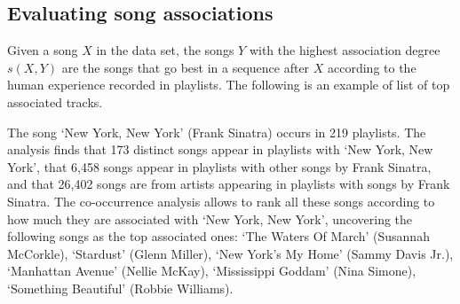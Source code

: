 
% 
% 

\subsection{Evaluating song associations} %
\label{sub:evaluating_song_association}

Given a song $X$ in the data set, the songs $Y$ with the highest association degree $s(X,Y)$ are the songs that go best in a sequence after $X$ according to the human experience recorded in playlists.
The following is an example of list of top associated tracks.

\begin{example}\label{ex:newyork}
The song `New York, New York' (Frank Sinatra) occurs in 219 playlists.
The analysis finds that 173 distinct songs appear in playlists with `New York, New York', that 6,458 songs appear in playlists with other songs by Frank Sinatra, and that 26,402 songs are from artists appearing in playlists with songs by Frank Sinatra.
The co-occurrence analysis allows to rank all these songs according to how much they are associated with `New York, New York', uncovering the following songs as the top associated ones:  `The Waters Of March' (Susannah McCorkle), `Stardust' (Glenn Miller), `New York's My Home' (Sammy Davis Jr.), `Manhattan Avenue' (Nellie McKay), `Mississippi Goddam' (Nina Simone), `Something Beautiful' (Robbie Williams).
\end{example}


